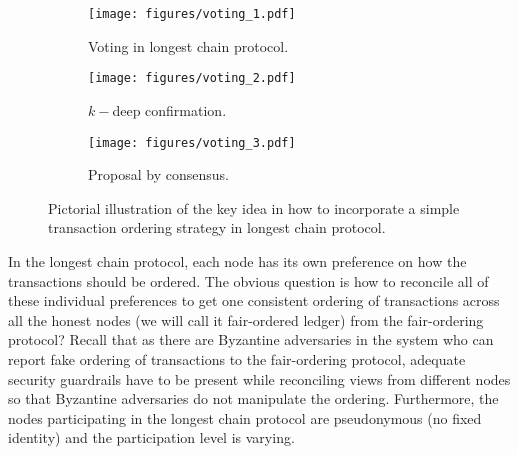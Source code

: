 \documentclass{article}
\begin{document}
\begin{figure}
    \centering
     \begin{subfigure}[b]{0.25\textwidth}
         \centering
         \texttt{[image: figures/voting\_1.pdf]}
         \caption{Voting in longest chain protocol.}
         \label{fig:voting-1}
     \end{subfigure}
     \hfill
     \begin{subfigure}[b]{0.25\textwidth}
         \centering
         \texttt{[image: figures/voting\_2.pdf]}
         \caption{$k-$deep confirmation.}
         \label{fig:voting-2}
     \end{subfigure}
     \hfill
     \begin{subfigure}[b]{0.25\textwidth}
         \centering
         \texttt{[image: figures/voting\_3.pdf]}
         \caption{Proposal by consensus.}
         \label{fig:voting-3}
     \end{subfigure}
        \caption{Pictorial illustration of the key idea in how to incorporate a simple transaction ordering strategy in longest chain protocol.}
        \label{fig:transition}
\end{figure}






In the longest chain protocol, each node has its own preference on how the transactions should be ordered. The obvious question is how to reconcile all of these individual preferences  to get one consistent ordering of transactions across all the honest nodes (we will call it fair-ordered ledger) from the fair-ordering protocol? Recall that as there are Byzantine adversaries in the system who can report fake ordering of transactions to the fair-ordering protocol, adequate security guardrails have to be present while reconciling views from different nodes so that Byzantine adversaries do not manipulate the ordering. Furthermore,  the nodes participating in the longest chain protocol are pseudonymous (no fixed identity) and the participation level is varying. 
\end{document}

